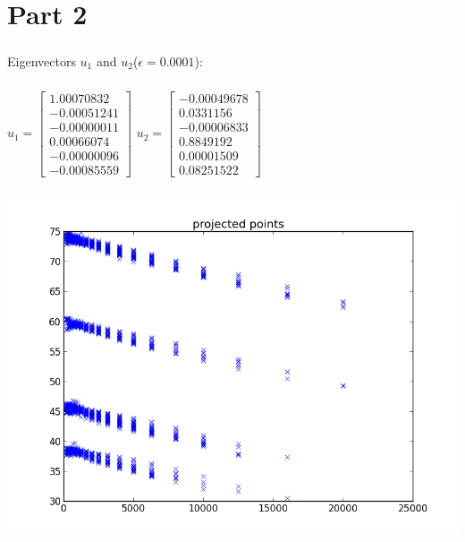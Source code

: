 \documentclass{article}
\begin{document}
\section{Part 2}
\subparagraph{}Eigenvectors $u_1$ and $u_2$($\epsilon = 0.0001$):
\subparagraph{}$u_1= 
\begin{bmatrix}1.00070832 \\
 -0.00051241  \\
 -0.00000011 \\
  0.00066074  \\
 -0.00000096  \\
 -0.00085559 
\end{bmatrix}
$
$u_2= 
\begin{bmatrix}-0.00049678\\
 0.0331156 \\
-0.00006833\\
 0.8849192 \\
 0.00001509\\
 0.08251522
\end{bmatrix}
$
\subparagraph{}\includegraphics[scale=0.5]{figure_4}
\end{document}

